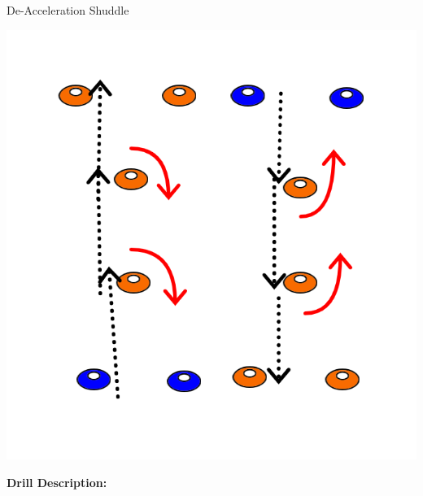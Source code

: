 
\begin{oddBlock}{De-Acceleration Shuddle}

\begin{minipage}[t]{\linewidth}
    \centering
    
    \begin{minipage}{.2\linewidth} %
            \includegraphics[width=\textwidth]{../img/Trimmed/deaccel_shuddle}
    \end{minipage}
    \hspace{0.05\linewidth}
    \begin{minipage}{.7\linewidth} %
        \textbf{Drill Description:}

\end{minipage}
\end{minipage}
\end{oddBlock}
